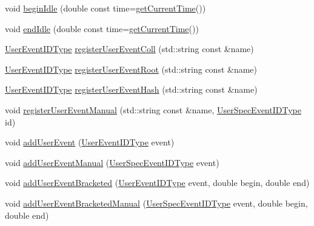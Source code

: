 \begin{DoxyCompactItemize}
\item 
void \hyperlink{structvt_1_1trace_1_1_trace_a530af1b7b48cf389744325f6f7e7f05e}{begin\+Idle} (double const time=\hyperlink{structvt_1_1trace_1_1_trace_a04cf6b76b4ced1bc90d246a34c948db5}{get\+Current\+Time}())
\item 
void \hyperlink{structvt_1_1trace_1_1_trace_a0262f4025460c9d61cac60420e75ef77}{end\+Idle} (double const time=\hyperlink{structvt_1_1trace_1_1_trace_a04cf6b76b4ced1bc90d246a34c948db5}{get\+Current\+Time}())
\item 
\hyperlink{namespacevt_1_1trace_a5908920d051c144c89f17c69ed262350}{User\+Event\+I\+D\+Type} \hyperlink{structvt_1_1trace_1_1_trace_a9a106f7f39e605745994d20bb526f8cf}{register\+User\+Event\+Coll} (std\+::string const \&name)
\item 
\hyperlink{namespacevt_1_1trace_a5908920d051c144c89f17c69ed262350}{User\+Event\+I\+D\+Type} \hyperlink{structvt_1_1trace_1_1_trace_a99fcca49a5506c3ee5cda67e541e37cc}{register\+User\+Event\+Root} (std\+::string const \&name)
\item 
\hyperlink{namespacevt_1_1trace_a5908920d051c144c89f17c69ed262350}{User\+Event\+I\+D\+Type} \hyperlink{structvt_1_1trace_1_1_trace_a1b80a8ca6bebbfbe61f8b119342e14f7}{register\+User\+Event\+Hash} (std\+::string const \&name)
\item 
void \hyperlink{structvt_1_1trace_1_1_trace_ade8d39718f60924f1aeb178ccda56cbc}{register\+User\+Event\+Manual} (std\+::string const \&name, \hyperlink{namespacevt_1_1trace_a70c43e0e1596eea236912d4197d3120a}{User\+Spec\+Event\+I\+D\+Type} id)
\item 
void \hyperlink{structvt_1_1trace_1_1_trace_a0a4bbdf7bd3c2b8742cbceb24389a4c0}{add\+User\+Event} (\hyperlink{namespacevt_1_1trace_a5908920d051c144c89f17c69ed262350}{User\+Event\+I\+D\+Type} event)
\item 
void \hyperlink{structvt_1_1trace_1_1_trace_a2d9fac6bd71ba67e4f87b7efd7c6c6c7}{add\+User\+Event\+Manual} (\hyperlink{namespacevt_1_1trace_a70c43e0e1596eea236912d4197d3120a}{User\+Spec\+Event\+I\+D\+Type} event)
\item 
void \hyperlink{structvt_1_1trace_1_1_trace_ae57a7ff5517a5bc0694677f10810b545}{add\+User\+Event\+Bracketed} (\hyperlink{namespacevt_1_1trace_a5908920d051c144c89f17c69ed262350}{User\+Event\+I\+D\+Type} event, double begin, double end)
\item 
void \hyperlink{structvt_1_1trace_1_1_trace_ab0dd676ca3870682b0c52669d3603c11}{add\+User\+Event\+Bracketed\+Manual} (\hyperlink{namespacevt_1_1trace_a70c43e0e1596eea236912d4197d3120a}{User\+Spec\+Event\+I\+D\+Type} event, double begin, double end)

\end{DoxyCompactItemize}
